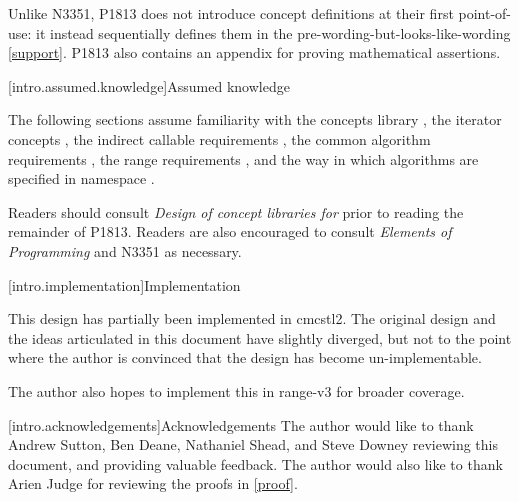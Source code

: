 Unlike N3351, P1813 does not introduce concept definitions at their first point-of-use: it instead
sequentially defines them in the pre-wording-but-looks-like-wording \ref{support}. P1813 also
contains an appendix for proving mathematical assertions.

[intro.assumed.knowledge]{Assumed knowledge}

The following sections assume familiarity with the concepts library , the
iterator concepts , the indirect callable requirements
, the common algorithm requirements , the range
requirements , and the way in which algorithms are specified in namespace
 .

Readers should consult \textit{Design of concept libraries for \Cpp{}}\cite{concept-design} prior to
reading the remainder of P1813. Readers are also encouraged to consult \textit{Elements of
Programming}\cite{EoP} and N3351 as necessary.

[intro.implementation]{Implementation}

This design has partially been implemented in cmcstl2. The original design and the ideas articulated
in this document have slightly diverged, but not to the point where the author is convinced that the
design has become un-implementable.

The author also hopes to implement this in range-v3 for broader coverage.

[intro.acknowledgements]{Acknowledgements}
The author would like to thank Andrew Sutton, Ben Deane, Nathaniel Shead, and Steve Downey reviewing
this document, and providing valuable feedback. The author would also like to thank Arien Judge for
reviewing the proofs in \ref{proof}.
